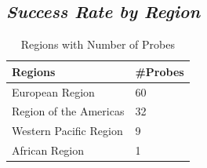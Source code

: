\subsection*{\textit{Success Rate by Region}}
\begin{table}[!h]
	\centering
	\caption{Regions with Number of Probes}
	\label{table:regions}
	\begin{tabular}{lp{2cm}}
  		\toprule
  		\textbf{Regions} & \textbf{\#Probes} \\ 
  		\midrule
  		European Region & 60 \\ 
  		Region of the Americas & 32 \\
  		Western Pacific Region & 9 \\
  		African Region & 1 \\
  		\bottomrule
\end{tabular}
\end{table}
